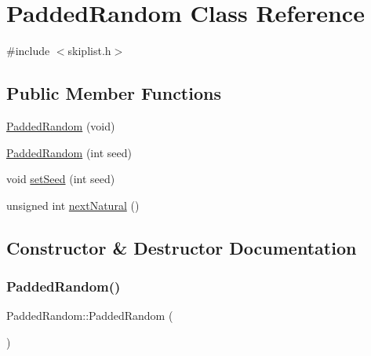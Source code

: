 \hypertarget{classPaddedRandom}{}\section{Padded\+Random Class Reference}
\label{classPaddedRandom}


{\ttfamily \#include $<$skiplist.\+h$>$}

\subsection*{Public Member Functions}
\begin{DoxyCompactItemize}
\item 
\hyperlink{classPaddedRandom_a30de8941922667495ec989833ae3060d}{Padded\+Random} (void)
\item 
\hyperlink{classPaddedRandom_af6b789b99addae961c831696648e8b51}{Padded\+Random} (int seed)
\item 
void \hyperlink{classPaddedRandom_a9229cc2aed4ba44d85799e6783b4f85e}{set\+Seed} (int seed)
\item 
unsigned int \hyperlink{classPaddedRandom_aa9ff82999be9687fd48ffa3ea5fb2628}{next\+Natural} ()
\end{DoxyCompactItemize}


\subsection{Constructor \& Destructor Documentation}
\mbox{\label{classPaddedRandom_a30de8941922667495ec989833ae3060d}} 
\subsubsection{\texorpdfstring{Padded\+Random()}{PaddedRandom()}\hspace{0.1cm}{\footnotesize\ttfamily [1/2]}}
{\footnotesize\ttfamily Padded\+Random\+::\+Padded\+Random (\begin{DoxyParamCaption}\item[{void}]{ }\end{DoxyParamCaption})\hspace{0.3cm}{\ttfamily [inline]}}

\mbox{\label{classPaddedRandom_af6b789b99addae961c831696648e8b51}} 
